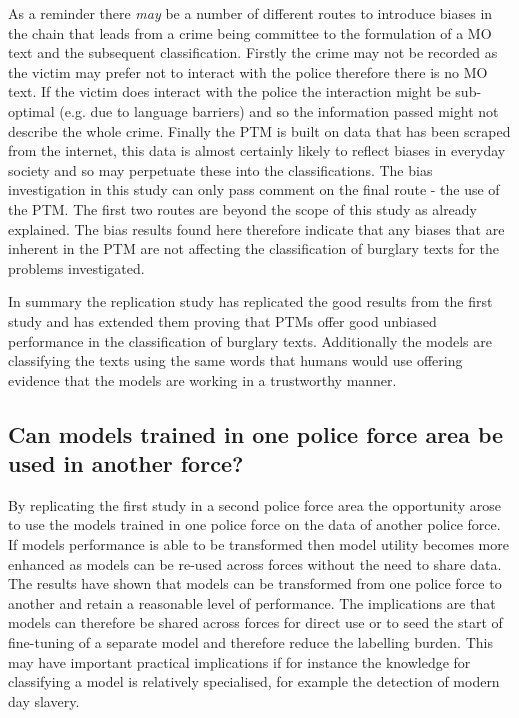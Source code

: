 As a reminder there \emph{may} be a number of different routes to introduce biases in the chain that leads from a crime being committee to the formulation of a MO text and the subsequent classification. Firstly the crime may not be recorded as the victim may prefer not to interact with the police therefore there is no MO text. If the victim does interact with the police the interaction might be sub-optimal (e.g. due to language barriers) and so the information passed might not describe the whole crime. Finally the PTM is built on data that has been scraped from the internet, this data is almost certainly likely to reflect biases in everyday society and so may perpetuate these into the classifications. The bias investigation in this study can only pass comment on the final route - the use of the PTM. The first two routes are beyond the scope of this study as already explained. The bias results found here therefore indicate that any biases that are inherent in the PTM are not affecting the classification of burglary texts for the problems investigated. 

In summary the replication study has replicated the good results from the first study and has extended them proving that PTMs offer good unbiased performance in the classification of burglary texts. Additionally the models are classifying the texts using the same words that humans would use offering evidence that the models are working in a trustworthy manner.


\subsection{Can models trained in one police force area be used in another force?} By replicating the first study in a second police force area the opportunity arose to use the models trained in one police force on the data of another police force. If models performance is able to be transformed then model utility becomes more enhanced as models can be re-used across forces without the need to share data. The results have shown that models can be transformed from one police force to another and retain a reasonable level of performance. The implications are that models can therefore be shared across forces for direct use or to seed the start of fine-tuning of a separate model and therefore reduce the labelling burden. This may have important practical implications if for instance the knowledge for classifying a model is relatively specialised, for example the detection of modern day slavery. 


